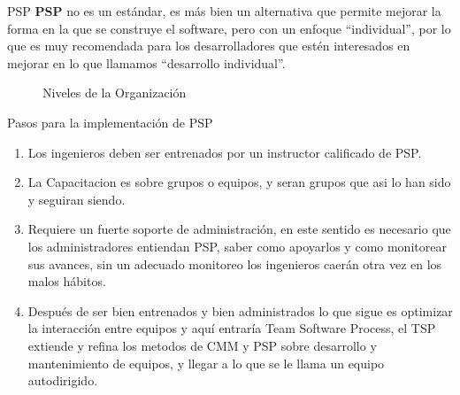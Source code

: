 \documentclass[]{beamer}
\begin{document}
			\begin{frame}{PSP}
				\textbf{PSP} no es un est\'andar, es m\'as bien un alternativa que permite mejorar la forma en la que se construye el software, pero con un enfoque ``individual'', por lo que es muy recomendada para los desarrolladores que estén interesados en mejorar en lo que llamamos ``desarrollo individual''.
				\begin{figure}
    				 \caption{Niveles de la Organización}
				\end{figure}
			\end{frame}
				
			\begin{frame}{Pasos para la implementación de PSP}
				\begin{enumerate}
					\item Los ingenieros deben ser entrenados por un instructor calificado de PSP. \\ \smallskip \pause
					\item La Capacitacion es sobre grupos o equipos, y seran grupos que asi lo han sido y seguiran siendo. \\ \smallskip \pause
					\item Requiere un fuerte soporte de administración, en este sentido es necesario que los administradores entiendan PSP, saber como apoyarlos y como monitorear sus avances, sin un adecuado monitoreo los ingenieros caerán otra vez en los malos hábitos. \\ \smallskip \pause
					\item Después de ser bien entrenados y bien administrados lo que sigue es optimizar la interacción entre equipos y aquí entraría Team Software Process, el TSP extiende y refina los metodos de CMM y PSP sobre desarrollo y mantenimiento de equipos, y llegar a lo que se le llama un equipo autodirigido. \\ \smallskip
				\end{enumerate}
			\end{frame}
			
\end{document}
